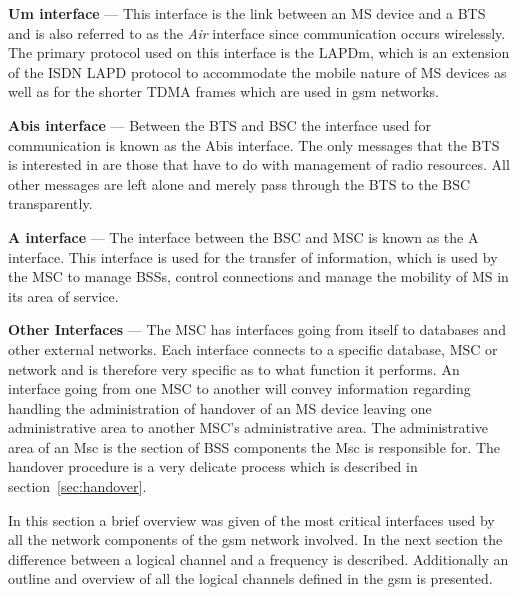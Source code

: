 \begin{description}
  \item{\textbf{Um interface}} --- This interface is the link between an \gls{MS} device and a \gls{BTS} and is also referred to as the \emph{Air} interface since communication occurs wirelessly. The primary protocol used on this interface is the \gls{LAPDm}, which is an extension of the \gls{ISDN} LAPD protocol to accommodate the mobile nature of \gls{MS} devices as well as for the shorter \gls{TDMA} frames which are used in \gls{gsm} networks\cite{wirelesstelcoMullet,GSMSecurInTeleNetwork}.
\item{\textbf{Abis interface}} --- Between the \gls{BTS} and \gls{BSC} the interface used for communication is known as the Abis interface. The only messages that the \gls{BTS} is interested in are those that have to do with management of radio resources\cite{wirelesstelcoMullet,GSMSecurInTeleNetwork}. All other messages are left alone and merely pass through the \gls{BTS} to the \gls{BSC} transparently.
\item{\textbf{A interface}} --- The interface between the \gls{BSC} and \gls{MSC} is known as the A interface. This interface is used for the transfer of information, which is used by the \gls{MSC} to manage BSSs, control connections and manage the mobility of \gls{MS} in its area of service\cite{wirelesstelcoMullet,GSMArchitectureProtocolsServices}.
\item{\textbf{Other Interfaces}} --- The \gls{MSC} has interfaces going from itself to databases and other external networks. Each interface connects to a specific database, \gls{MSC} or network and is therefore very specific as to what function it performs\cite{wirelesstelcoMullet,GSMArchitectureProtocolsServices}. An interface going from one \gls{MSC} to another will convey information regarding handling the administration of handover of an \gls{MS} device leaving one administrative area to another MSC's administrative area. The administrative area of an Msc is the section of \gls{BSS} components the Msc is responsible for. The handover procedure is a very delicate process which is described in section~\ref{sec:handover}.
\end{description}

In this section a brief overview was given of the most critical interfaces used by all the network components of the \gls{gsm} network involved. In the next section the difference between a logical channel and a frequency is described. Additionally an outline and overview of all the logical channels defined in the \gls{gsm} is presented. 
